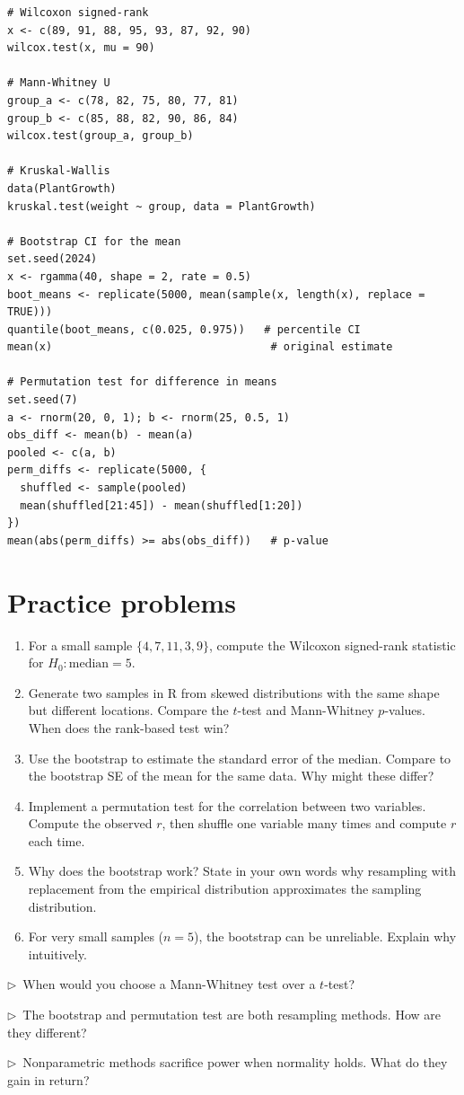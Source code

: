 \begin{codelab}
\begin{lstlisting}[language=Rlang]
# Wilcoxon signed-rank
x <- c(89, 91, 88, 95, 93, 87, 92, 90)
wilcox.test(x, mu = 90)

# Mann-Whitney U
group_a <- c(78, 82, 75, 80, 77, 81)
group_b <- c(85, 88, 82, 90, 86, 84)
wilcox.test(group_a, group_b)

# Kruskal-Wallis
data(PlantGrowth)
kruskal.test(weight ~ group, data = PlantGrowth)

# Bootstrap CI for the mean
set.seed(2024)
x <- rgamma(40, shape = 2, rate = 0.5)
boot_means <- replicate(5000, mean(sample(x, length(x), replace = TRUE)))
quantile(boot_means, c(0.025, 0.975))   # percentile CI
mean(x)                                  # original estimate

# Permutation test for difference in means
set.seed(7)
a <- rnorm(20, 0, 1); b <- rnorm(25, 0.5, 1)
obs_diff <- mean(b) - mean(a)
pooled <- c(a, b)
perm_diffs <- replicate(5000, {
  shuffled <- sample(pooled)
  mean(shuffled[21:45]) - mean(shuffled[1:20])
})
mean(abs(perm_diffs) >= abs(obs_diff))   # p-value
\end{lstlisting}
\end{codelab}

\section{Practice problems}

\begin{enumerate}
  \item For a small sample $\{4, 7, 11, 3, 9\}$, compute the Wilcoxon signed-rank statistic for $H_0\colon \text{median} = 5$.
  \item Generate two samples in R from skewed distributions with the same shape but different locations. Compare the $t$-test and Mann-Whitney $p$-values. When does the rank-based test win?
  \item Use the bootstrap to estimate the standard error of the median. Compare to the bootstrap SE of the mean for the same data. Why might these differ?
  \item Implement a permutation test for the correlation between two variables. Compute the observed $r$, then shuffle one variable many times and compute $r$ each time.
  \item Why does the bootstrap work? State in your own words why resampling with replacement from the empirical distribution approximates the sampling distribution.
  \item For very small samples ($n = 5$), the bootstrap can be unreliable. Explain why intuitively.
\end{enumerate}

\begin{reflect}
$\triangleright$~When would you choose a Mann-Whitney test over a $t$-test?

\smallskip
$\triangleright$~The bootstrap and permutation test are both resampling methods. How are they different?

\smallskip
$\triangleright$~Nonparametric methods sacrifice power when normality holds. What do they gain in return?
\end{reflect}
